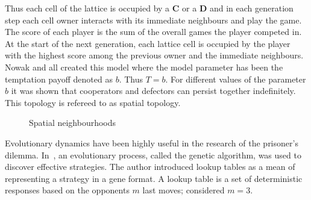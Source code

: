 \documentclass{article}
\begin{document}
Thus each cell of the lattice is occupied by a \textbf{C} or a \textbf{D} and in
each generation step each cell owner interacts with its immediate neighbours and
play the game. The score of each player is the sum of the overall games the player
competed in. At the start of the next generation, each lattice cell is occupied by the
player with the highest score among the previous owner and the immediate
neighbours. Nowak and all created this model where the model parameter
has been the temptation payoff denoted as \(b\). Thus \(T=b\). For 
different values of the parameter \(b\) it was shown that cooperators and
defectors can persist together indefinitely. This topology is refereed to as
spatial topology.

\begin{figure}[!hbtp]
\centering
    \begin{subfigure}{.25\textwidth}
        \hspace{.8cm}
            
    \end{subfigure}
    \begin{subfigure}{.25\textwidth}\centering
         
     \end{subfigure}
     \begin{subfigure}{.25\textwidth}\centering
         
     \end{subfigure}
    \begin{subfigure}{.25\textwidth}
            
    \end{subfigure}
    \begin{subfigure}{.25\textwidth}\centering
         
     \end{subfigure}
     \begin{subfigure}{.25\textwidth}\centering
         
     \end{subfigure}
     \caption{Spatial neighbourhoods}\label{fig:topologies}
    \end{figure}

Evolutionary dynamics have been highly useful in the research of the prisoner's
dilemma. In~\cite{Axelrod1987}, an evolutionary process, called the genetic
algorithm, was used to discover effective strategies. The author introduced
lookup tables as a mean of representing a strategy in a gene format. A lookup
table is a set of deterministic responses based on the opponents \(m\) last
moves; \cite{Axelrod1987} considered \(m=3\).
\end{document}
